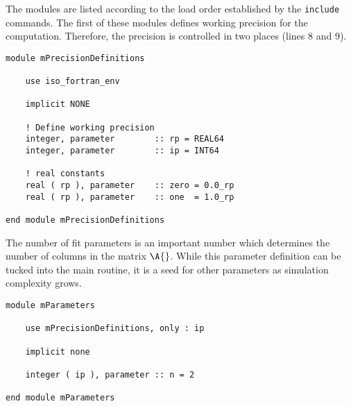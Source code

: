 The modules are listed according to the load order established by the \texttt{include} commands. The first of these modules defines working precision for the computation. Therefore, the precision is controlled in two places (lines 8 and 9).
\begin{lstlisting}
module mPrecisionDefinitions

    use iso_fortran_env

    implicit NONE

    ! Define working precision
    integer, parameter        :: rp = REAL64
    integer, parameter        :: ip = INT64

    ! real constants
    real ( rp ), parameter    :: zero = 0.0_rp
    real ( rp ), parameter    :: one  = 1.0_rp

end module mPrecisionDefinitions
\end{lstlisting}

The number of fit parameters is an important number which determines the number of columns in the matrix $\A{}$. While this parameter definition can be tucked into the main routine, it is a seed for other parameters as simulation complexity grows.
\begin{lstlisting}
module mParameters

    use mPrecisionDefinitions, only : ip

    implicit none

    integer ( ip ), parameter :: n = 2

end module mParameters
\end{lstlisting}

